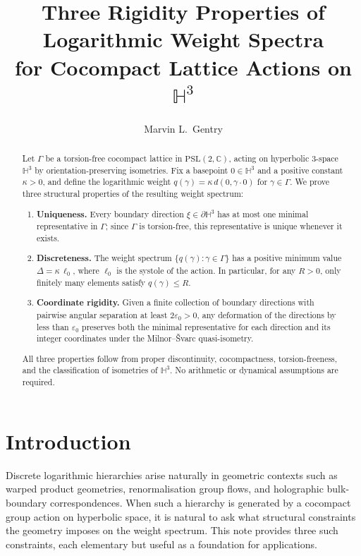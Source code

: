 \documentclass[12pt]{article}
\title{Three Rigidity Properties of Logarithmic Weight Spectra\\
for Cocompact Lattice Actions on $\mathbb{H}^3$}
\date{}
\author[1]{Marvin L.\ Gentry}
\affil[1]{Independent Researcher\\
  \texttt{drmlgentry@protonmail.com}\\
  ORCID: 0009-0006-4550-2663}
\theoremstyle{definition}
\theoremstyle{remark}
\begin{document}
\maketitle

\begin{abstract}
Let $\Gamma$ be a torsion-free cocompact lattice in
$\mathrm{PSL}(2,\mathbb{C})$, acting on hyperbolic 3-space $\mathbb{H}^3$
by orientation-preserving isometries. Fix a basepoint $0\in\mathbb{H}^3$
and a positive constant $\kappa>0$, and define the logarithmic weight
$q(\gamma)=\kappa\,d(0,\gamma\cdot0)$ for $\gamma\in\Gamma$.
We prove three structural properties of the resulting weight spectrum:
\begin{enumerate}
\item[(i)] \textbf{Uniqueness.} Every boundary direction
      $\xi\in\partial\mathbb{H}^3$ has at most one minimal representative
      in $\Gamma$; since $\Gamma$ is torsion-free, this representative is
      unique whenever it exists.
\item[(ii)] \textbf{Discreteness.} The weight spectrum
      $\{q(\gamma):\gamma\in\Gamma\}$ has a positive minimum value
      $\Delta=\kappa\,\ell_0$, where $\ell_0$ is the systole of the action.
      In particular, for any $R>0$, only finitely many elements satisfy
      $q(\gamma)\le R$.
\item[(iii)] \textbf{Coordinate rigidity.} Given a finite collection of
      boundary directions with pairwise angular separation at least
      $2\varepsilon_0>0$, any deformation of the directions by less than
      $\varepsilon_0$ preserves both the minimal representative for each
      direction and its integer coordinates under the Milnor--\v{S}varc
      quasi-isometry.
\end{enumerate}
All three properties follow from proper discontinuity, cocompactness,
torsion-freeness, and the classification of isometries of $\mathbb{H}^3$.
No arithmetic or dynamical assumptions are required.
\end{abstract}

\section{Introduction}

Discrete logarithmic hierarchies arise naturally in geometric contexts
such as warped product geometries, renormalisation group flows, and
holographic bulk-boundary correspondences. When such a hierarchy is
generated by a cocompact group action on hyperbolic space, it is natural
to ask what structural constraints the geometry imposes on the weight
spectrum. This note provides three such constraints, each elementary
but useful as a foundation for applications.
\end{document}
